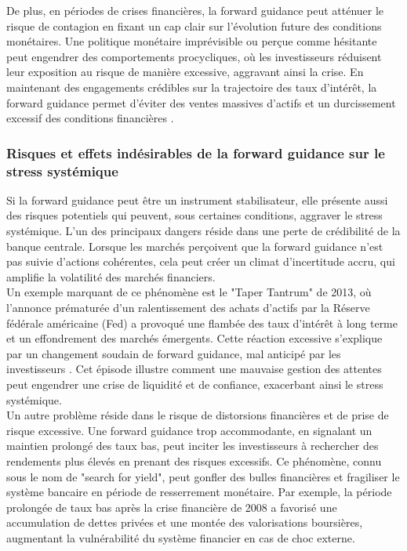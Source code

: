De plus, en périodes de crises financières, la forward guidance peut atténuer le risque de contagion en fixant un cap clair sur l’évolution future des conditions monétaires. Une politique monétaire imprévisible ou perçue comme hésitante peut engendrer des comportements procycliques, où les investisseurs réduisent leur exposition au risque de manière excessive, aggravant ainsi la crise. En maintenant des engagements crédibles sur la trajectoire des taux d’intérêt, la forward guidance permet d’éviter des ventes massives d’actifs et un durcissement excessif des conditions financières \citep{swanson2021}.

\subsubsection{Risques et effets indésirables de la forward guidance sur le stress systémique}

Si la forward guidance peut être un instrument stabilisateur, elle présente aussi des risques potentiels qui peuvent, sous certaines conditions, aggraver le stress systémique. L’un des principaux dangers réside dans une perte de crédibilité de la banque centrale. Lorsque les marchés perçoivent que la forward guidance n’est pas suivie d’actions cohérentes, cela peut créer un climat d’incertitude accru, qui amplifie la volatilité des marchés financiers.\\

Un exemple marquant de ce phénomène est le "Taper Tantrum" de 2013, où l’annonce prématurée d’un ralentissement des achats d’actifs par la Réserve fédérale américaine (Fed) a provoqué une flambée des taux d’intérêt à long terme et un effondrement des marchés émergents. Cette réaction excessive s’explique par un changement soudain de forward guidance, mal anticipé par les investisseurs \citep{gürkaynak2015}. Cet épisode illustre comment une mauvaise gestion des attentes peut engendrer une crise de liquidité et de confiance, exacerbant ainsi le stress systémique.\\

Un autre problème réside dans le risque de distorsions financières et de prise de risque excessive. Une forward guidance trop accommodante, en signalant un maintien prolongé des taux bas, peut inciter les investisseurs à rechercher des rendements plus élevés en prenant des risques excessifs. Ce phénomène, connu sous le nom de "search for yield", peut gonfler des bulles financières et fragiliser le système bancaire en période de resserrement monétaire. Par exemple, la période prolongée de taux bas après la crise financière de 2008 a favorisé une accumulation de dettes privées et une montée des valorisations boursières, augmentant la vulnérabilité du système financier en cas de choc externe.

